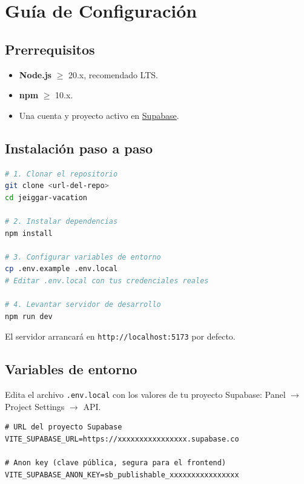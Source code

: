 \documentclass[12pt,letterpaper]{article}
\newcommand{\code}[1]{\texttt{#1}}
\begin{document}
\section{Guía de Configuración}

\subsection{Prerrequisitos}

\begin{itemize}
    \item \textbf{Node.js} $\geq$ 20.x, recomendado LTS.
    \item \textbf{npm} $\geq$ 10.x.
    \item Una cuenta y proyecto activo en \href{https://supabase.com}{Supabase}.
\end{itemize}

\subsection{Instalación paso a paso}

\begin{lstlisting}[language=bash]
# 1. Clonar el repositorio
git clone <url-del-repo>
cd jeiggar-vacation

# 2. Instalar dependencias
npm install

# 3. Configurar variables de entorno
cp .env.example .env.local
# Editar .env.local con tus credenciales reales

# 4. Levantar servidor de desarrollo
npm run dev
\end{lstlisting}

El servidor arrancará en \code{http://localhost:5173} por defecto.

\subsection{Variables de entorno}

Edita el archivo \code{.env.local} con los valores de tu proyecto Supabase: Panel $\rightarrow$ Project Settings $\rightarrow$ API.

\begin{lstlisting}[language={}]
# URL del proyecto Supabase
VITE_SUPABASE_URL=https://xxxxxxxxxxxxxxxx.supabase.co

# Anon key (clave pública, segura para el frontend)
VITE_SUPABASE_ANON_KEY=sb_publishable_xxxxxxxxxxxxxxxx
\end{lstlisting}
\end{document}
